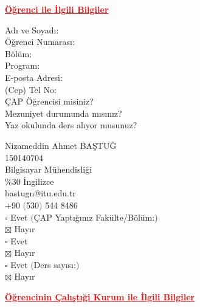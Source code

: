 \documentclass[12pt]{article}
\makeatletter
\newcommand{\isim}{Nizameddin Ahmet BAŞTUĞ}
\newcommand{\id}{150140704}
\newcommand{\mail}{bastugn@itu.edu.tr}
\makeatother
\begin{document}
{\centering
  \textcolor{red}{\bfseries \ul{ Öğrenci ile İlgili Bilgiler}}
  \\[1\baselineskip]
  \par}
\begin{minipage}[t]{.3\textwidth}
  \vspace{0pt}
  \begin{flushright}
  Adı ve Soyadı: \\
  Öğrenci Numarası: \\
  Bölüm: \\
  Program: \\ 
  E-posta Adresi: \\
  (Cep) Tel No: \\
  ÇAP Öğrencisi misiniz? \\[2\baselineskip]
  Mezuniyet durumunda mısınız? \\[1\baselineskip]
  Yaz okulunda ders alıyor musunuz? \\
  \end{flushright}
\end{minipage}%
\hspace{0.5cm}
\begin{minipage}[t]{.7\textwidth}
  \vspace{0pt}
  \isim\\
  \id\\
  Bilgisayar Mühendisliği \\
  \%30 İngilizce \\
  \mail\\
  +90 $($530$)$ 544 8486 \\
  $\square$ Evet $($ÇAP Yaptığınız Fakülte/Bölüm:\underline{\hspace{3cm}}$)$ \\
  $\boxtimes$ Hayır \\[1\baselineskip]
  $\square$ Evet \\
  $\boxtimes$ Hayır \\[1\baselineskip]
  $\square$ Evet $($Ders sayısı:\textunderscore$)$ \\
  $\boxtimes$ Hayır \\
\end{minipage}

{\centering
  \textcolor{red}{\bfseries \ul{Öğrencinin Çalıştıği Kurum ile İlgili Bilgiler}}
  \\[1\baselineskip]
  \par}
\end{document}
